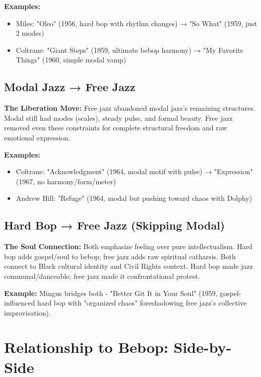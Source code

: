 \documentclass[11pt]{article}
\begin{document}
\textbf{Examples:}
\begin{itemize}[leftmargin=*, itemsep=0.2em]
\item Miles: "Oleo" (1956, hard bop with rhythm changes) → "So What" (1959, just 2 modes)
\item Coltrane: "Giant Steps" (1959, ultimate bebop harmony) → "My Favorite Things" (1960, simple modal vamp)
\end{itemize}

\subsection*{Modal Jazz → Free Jazz}
\textbf{The Liberation Move:} Free jazz abandoned modal jazz's remaining structures. Modal still had modes (scales), steady pulse, and formal beauty. Free jazz removed even these constraints for complete structural freedom and raw emotional expression.

\textbf{Examples:}
\begin{itemize}[leftmargin=*, itemsep=0.2em]
\item Coltrane: "Acknowledgment" (1964, modal motif with pulse) → "Expression" (1967, no harmony/form/meter)
\item Andrew Hill: "Refuge" (1964, modal but pushing toward chaos with Dolphy)
\end{itemize}

\subsection*{Hard Bop → Free Jazz (Skipping Modal)}
\textbf{The Soul Connection:} Both emphasize feeling over pure intellectualism. Hard bop adds gospel/soul to bebop; free jazz adds raw spiritual catharsis. Both connect to Black cultural identity and Civil Rights context. Hard bop made jazz communal/danceable; free jazz made it confrontational protest.

\textbf{Example:} Mingus bridges both - "Better Git It in Your Soul" (1959, gospel-influenced hard bop with "organized chaos" foreshadowing free jazz's collective improvisation).

\section*{Relationship to Bebop: Side-by-Side}
\end{document}
